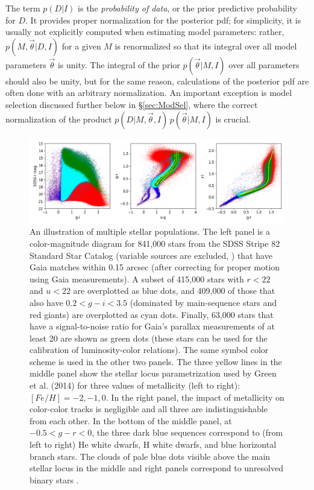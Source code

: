 The term $p(D|I)$ is the {\it probability of data}, or the prior predictive probability for $D$. 
It provides proper normalization for the posterior  pdf; for simplicity, it is usually not explicitly computed
when estimating model parameters: rather, $p(M,\vec{\theta}|D,I)$ for a given $M$
is renormalized so that
its integral over all model parameters $\vec{\theta}$ is unity.  The integral of the prior $p(\vec{\theta}|M,I)$
over all parameters should also be unity, but for the same reason, calculations of the posterior pdf are
often done with an arbitrary normalization. An important exception is model selection discussed further
below in \S\ref{sec:ModSel}, where the correct normalization of the product $p(D|M,\vec{\theta},I) \, p(\vec{\theta}|M,I)$ is crucial.  


\begin{figure}[t!]
\includegraphics[width=1.0\textwidth,angle=0]{figures/plot3diagsData.png} 
\caption{An illustration of multiple stellar populations.
  The left panel is a color-magnitude diagram  for 841,000 stars from the SDSS Stripe 82 Standard Star Catalog
(variable sources are excluded, \citealt{2021MNRAS.505.5941T}) that have Gaia matches within 0.15 arcsec (after correcting for proper
motion using Gaia measurements). A subset of 415,000 stars with $r < 22$ and $u<22$ are overplotted as blue dots, and 409,000 of those that
also have $0.2 < g-i < 3.5$ (dominated by main-sequence stars and red giants) are overplotted as cyan dots. Finally, 63,000 stars that have
a signal-to-noise ratio for Gaia’s parallax measurements of at least
20 are shown as green dots (these stars can be used for the
calibration of luminosity-color relations). The same symbol color
scheme is used in the other two panels. The three yellow lines in the
middle panel show the stellar locus parametrization used by Green et al. (2014) for three values of metallicity (left to right): $[Fe/H] = -2, -1, 0$. In the right panel, the impact of metallicity on color-color tracks is negligible and all three are indistinguishable from each other. In the bottom of the middle panel, at $-0.5 < g-r < 0$, the three dark blue sequences correspond to (from left to right) He white dwarfs, H white dwarfs, and blue horizontal branch stars. The clouds of pale blue dots visible above the main stellar locus in the middle and right panels correspond to unresolved binary stars \citep{2004ApJ...615L.141S}.} \label{fig:3dataDiags}
\end{figure}



